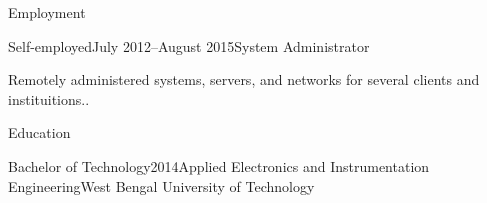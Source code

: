 \documentclass{resume} %
\begin{document}
\begin{rSection}{Employment}

\begin{rSubsection}{Self-employed}{July 2012--August 2015}{System Administrator}{}
\item Remotely administered systems, servers, and networks for several clients and instituitions..
\end{rSubsection}

\end{rSection}


\begin{rSection}{Education}

\begin{rSubsection}{Bachelor of Technology}{2014}{Applied Electronics and Instrumentation Engineering}{West Bengal University of Technology}
\item[] %
\end{rSubsection}

\end{rSection}

\end{document}
